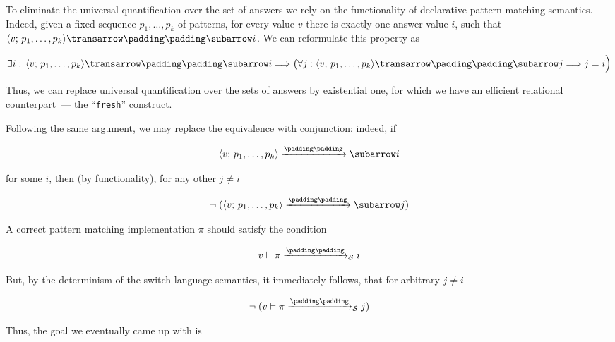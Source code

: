 \setarrow{\xrightarrow}

To eliminate the universal quantification over the set of answers we rely on the functionality of declarative pattern matching semantics. Indeed, given a fixed sequence $p_1,\dots,p_k$
of patterns, for every value $v$ there is exactly one answer value $i$, such that $\trans{\inbr{v;\,p_1,\dots,p_k}}{}{i}$. We can reformulate this property as

\[
\exists i:\, \trans{\inbr{v;\,p_1,\dots,p_k}}{}{i} \Longrightarrow  
\big(\forall j : \trans{\inbr{v;\,p_1,\dots,p_k}}{}{j} \Longrightarrow  j=i\large\big)
\]

Thus, we can replace universal quantification over the sets of answers by existential one, for which we have an efficient relational counterpart~--- the ``\lstinline|fresh|''
construct.

Following the same argument, we may replace the equivalence with conjunction: indeed, if

\[
\setarrow{\xrightarrow}
\trans{\inbr{v;\,p_1,\dots,p_k}}{}{i}
\]

for some $i$, then (by functionality), for any other $j\ne i$

\[
\setarrow{\xrightarrow}
\neg\;(\trans{\inbr{v;\,p_1,\dots,p_k}}{}{j})
\]

A correct pattern matching implementation $\pi$ should satisfy the condition

\[
\setarrow{\xrightarrow}
\setsubarrow{_{\mathcal S}}
\withenv{v}{\trans{\pi}{}{i}}
\]

But, by the determinism of the switch language semantics, it immediately follows, that for arbitrary $j\ne i$

\[
\setarrow{\xrightarrow}
\setsubarrow{_{\mathcal S}}
\neg\;(\withenv{v}{\trans{\pi}{}{j}})
\]

\begin{comment}
Alternatively\footnote{\color{red} Reviewer N1 said that passage about bool argument is unclear and may be omitted (or described with more details)}, we could switch to a more explicit relational representation of both semantics, adding an extra boolean argument to
both $eval^o_{\mathcal S}$ and $match^o$ and using the same fresh variable $b$ in the query of interest:

\[
match^o\,v\,p_1,\dots,p_k\,i\,b \wedge eval^o_{\mathcal S}\,v\,\pi\,i\,b
\]

\end{comment} 

Thus, the goal we eventually came up with is

